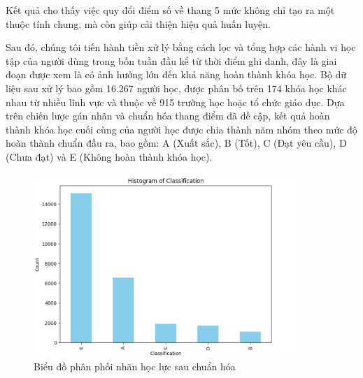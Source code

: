 Kết quả cho thấy việc quy đổi điểm số về thang 5 mức không chỉ tạo ra một thuộc tính chung, mà còn giúp cải thiện hiệu quả huấn luyện.

 
Sau đó, chúng tôi tiến hành tiền xử lý bằng cách lọc và tổng hợp các hành vi học tập của người dùng trong bốn tuần đầu kể từ thời điểm ghi danh, đây là giai đoạn được xem là có ảnh hưởng lớn đến khả năng hoàn thành khóa học.
Bộ dữ liệu sau xử lý bao gồm 16.267 người học, được phân bố trên 174 khóa học khác nhau từ nhiều lĩnh vực và thuộc về 915 trường học hoặc tổ chức giáo dục. Dựa trên chiến lược gán nhãn và chuẩn hóa thang điểm đã đề cập, kết quả hoàn thành khóa học cuối cùng của người học được chia thành năm nhóm theo mức độ hoàn thành chuẩn đầu ra, bao gồm: A (Xuất sắc), B (Tốt), C (Đạt yêu cầu), D (Chưa đạt) và E (Không hoàn thành khóa học).
\begin{figure}[H]
    \centering
    \includegraphics[width=0.9\textwidth]{imgs/Histogram of Classification.png}
    \caption{Biểu đồ phân phối nhãn học lực sau chuẩn hóa}
    \label{fig:label}
\end{figure}


